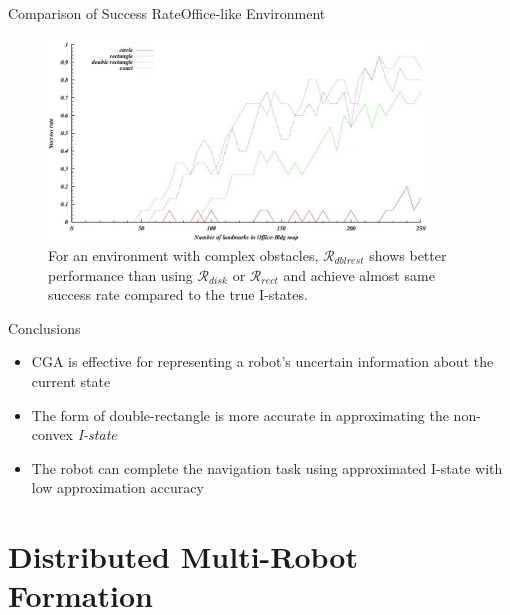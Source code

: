 \begin{frame}{Comparison of Success Rate}{Office-like Environment}
  \begin{figure}
    \includegraphics[width=0.9\textwidth]{figs/rate-office.jpg}
    \caption{For an environment with complex obstacles, $\mathcal{R}_{dblrest}$ shows
      better performance than using $\mathcal{R}_{disk}$ or $\mathcal{R}_{rect}$ and
      achieve almost same success rate compared to the true I-states.}
  \end{figure}
\end{frame}
\begin{frame}{Conclusions}
  \begin{itemize}
  \item CGA is effective for representing a robot's uncertain information about
    the current state
  \item The form of double-rectangle is more accurate in approximating the non-convex
    \emph{I-state}
  \item The robot can complete the navigation task using approximated I-state with
    low approximation accuracy
  \end{itemize}
\end{frame}

\section{Distributed Multi-Robot Formation}
\tableofcontents[currentsection] 
